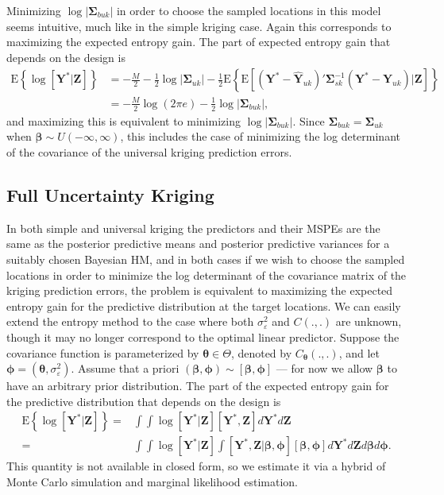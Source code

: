 \documentclass[12pt]{article}
\begin{document}
Minimizing $\log|\bm{\Sigma}_{buk}|$ in order to choose the sampled locations in this model seems intuitive, much like in the simple kriging case. Again this corresponds to maximizing the expected entropy gain. The part of expected entropy gain that depends on the design is
\begin{align*}
\mathrm{E}\left\{\log[\bm{Y}^*|\bm{Z}]\right\} &= -\frac{M}{2} - \frac{1}{2}\log|\bm{\Sigma}_{uk}| - \frac{1}{2}\mathrm{E}\left\{\mathrm{E}[(\bm{Y}^* - \widehat{\bm{Y}}_{uk})'\bm{\Sigma}_{sk}^{-1}(\bm{Y}^* - \widehat{\bm{Y}}_{uk})|\bm{Z}]\right\}\\
&= -\frac{M}{2}\log(2\pi e) - \frac{1}{2}\log|\bm{\Sigma}_{buk}|,
\end{align*}
and maximizing this is equivalent to minimizing $\log|\bm{\Sigma}_{buk}|$. Since $\bm{\Sigma}_{buk} = \bm{\Sigma}_{uk}$ when $\bm{\beta}\sim U(-\infty,\infty)$, this includes the case of minimizing the log determinant of the covariance of the universal kriging prediction errors.
\subsection{Full Uncertainty Kriging}
In both simple and universal kriging the predictors and their MSPEs are the same as the posterior predictive means and posterior predictive variances for a suitably chosen Bayesian HM, and in both cases if we wish to choose the sampled locations in order to minimize the log determinant of the covariance matrix of the kriging prediction errors, the problem is equivalent to maximizing the expected entropy gain for the predictive distribution at the target locations. We can easily extend the entropy method to the case where both $\sigma^2_{\varepsilon}$ and $C(.,.)$ are unknown, though it may no longer correspond to the optimal linear predictor. Suppose the covariance function is parameterized by $\bm{\theta}\in\Theta$, denoted by $C_{\bm{\theta}}(.,.)$, and let $\bm{\phi} = (\bm{\theta}, \sigma^2_{\varepsilon})$. Assume that a priori $(\bm{\beta},\bm{\phi})\sim [\bm{\beta},\bm{\phi}]$ --- for now we allow $\bm{\beta}$ to have an arbitrary prior distribution. The part of the expected entropy gain for the predictive distribution that depends on the design is
\begin{align*}
\mathrm{E}\left\{\log[\bm{Y}^*|\bm{Z}]\right\} =& \int \int \log[\bm{Y}^*|\bm{Z}] [\bm{Y}^*,\bm{Z}]d\bm{Y}^*d\bm{Z}\\ 
=& \int\int\log[\bm{Y}^*|\bm{Z}]\int[\bm{Y}^*,\bm{Z}|\bm{\beta},\bm{\phi}][\bm{\beta},\bm{\phi}]d\bm{Y}^*d\bm{Z}d\bm{\beta}d\bm{\phi}.
\end{align*}
This quantity is not available in closed form, so we estimate it via a hybrid of Monte Carlo simulation and marginal likelihood estimation. 
\end{document}
